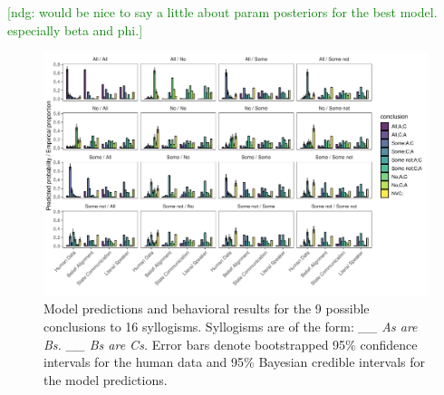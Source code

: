 \documentclass[floatsintext, doc]{apa6}
\newcommand{\datafoldername}{csv_to_tex}
\newcommand{\rlgetvalue}[4]{\csvreader[filter strcmp={\mykey}{#3},
             late after line = {{,}\ }, late after last line = {{}}]
            {\datafoldername/#1}{#2=\mykey,#4=\myvalue}{\myvalue}}
\newcommand{\ndg}[1]{{\textcolor{Green}{[ndg: #1]}}}
\begin{document}
\ndg{would be nice to say a little about param posteriors for the best model. especially beta and phi.}

\begin{figure}[t]
\centering
\includegraphics[width = \textwidth]{figs/bda_rsa_bars_0params.pdf}
\caption{Model predictions and behavioral results for the 9 possible conclusions to 16 syllogisms. Syllogisms are of the form: \emph{\_\_ As are Bs. \_\_ Bs are Cs.} Error bars denote bootstrapped 95\% confidence intervals for the human data and 95\% Bayesian credible intervals for the model predictions.}
\label{fig:bars}
\end{figure}





%
%   
%
%


            
\end{document}
